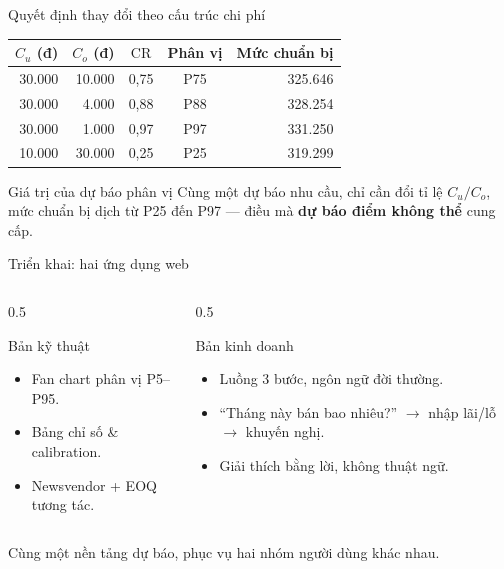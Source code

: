\documentclass[aspectratio=169,11pt]{beamer}
\newcommand{\CR}{\ensuremath{\mathrm{CR}}}
\newcommand{\Cu}{\ensuremath{C_u}}
\newcommand{\Co}{\ensuremath{C_o}}
\begin{document}
\begin{frame}{Quyết định thay đổi theo cấu trúc chi phí}
  \centering
  \begin{tabular}{rrccr}
    \toprule
    $\Cu$ (đ) & $\Co$ (đ) & \CR & Phân vị & Mức chuẩn bị \\
    \midrule
    30.000 & 10.000 & 0,75 & P75 & 325.646 \\
    30.000 & 4.000  & 0,88 & P88 & 328.254 \\
    30.000 & 1.000  & 0,97 & P97 & 331.250 \\
    10.000 & 30.000 & 0,25 & P25 & 319.299 \\
    \bottomrule
  \end{tabular}
  \vfill
  \begin{exampleblock}{Giá trị của dự báo phân vị}
    Cùng một dự báo nhu cầu, chỉ cần đổi tỉ lệ $\Cu/\Co$, mức chuẩn bị dịch từ
    P25 đến P97 --- điều mà \textbf{dự báo điểm không thể} cung cấp.
  \end{exampleblock}
\end{frame}

\begin{frame}{Triển khai: hai ứng dụng web}
  \begin{columns}[T]
    \begin{column}{0.5\textwidth}
      \begin{block}{Bản kỹ thuật}
        \begin{itemize}\small
          \item Fan chart phân vị P5--P95.
          \item Bảng chỉ số \& calibration.
          \item Newsvendor + EOQ tương tác.
        \end{itemize}
      \end{block}
    \end{column}
    \begin{column}{0.5\textwidth}
      \begin{block}{Bản kinh doanh}
        \begin{itemize}\small
          \item Luồng 3 bước, ngôn ngữ đời thường.
          \item ``Tháng này bán bao nhiêu?'' $\rightarrow$ nhập lãi/lỗ $\rightarrow$ khuyến nghị.
          \item Giải thích bằng lời, không thuật ngữ.
        \end{itemize}
      \end{block}
    \end{column}
  \end{columns}
  \vfill
  \centering\footnotesize Cùng một nền tảng dự báo, phục vụ hai nhóm người dùng khác nhau.
\end{frame}
\end{document}
